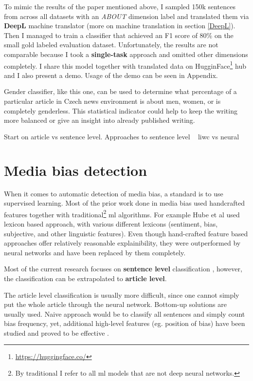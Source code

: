 To mimic the results of the paper mentioned above, I sampled 150k sentences from across all datasets with an \textit{ABOUT} dimension label and translated them via \textbf{DeepL} machine translator (more on machine translation in section \ref{DeepL}). Then I managed to train a classifier that achieved an F1 score of 80\% on the small gold labeled evaluation dataset. Unfortunately, the results are not comparable because I took a \textbf{single-task} approach and omitted other dimensions completely. I share this model together with translated data on HugginFace\footnote{\url{https://huggingface.co/}} hub and I also present a demo. Usage of the demo can be seen in Appendix.

Gender classifier, like this one, can be used to determine what percentage of a particular article in Czech news environment is about men, women, or is completely genderless. This statistical indicator could help to keep the writing more balanced or give an insight into already published writing.





Start on article vs sentence level.
Approaches to sentence level ~ liwc vs neural

\section{Media bias detection}
When it comes to automatic detection of media bias, a standard is to use supervised learning. Most of the prior work done in media bias used handcrafted features together with traditional\footnote{By traditional I refer to all \Gls{ml} models that are not deep neural networks.} \Gls{ml} algorithms. For example Hube et al \cite{hube2018detecting} used lexicon based approach, with various different lexicons (sentiment, bias, subjective, and other linguistic features). Even though hand-crafted feature based approaches offer relatively reasonable explainibility, they were outperformed by neural networks and have been replaced by them completely.

Most of the current research focuses on \textbf{sentence level} classification \cite{sinha2021determining,Spinde2021MBIC,lee2021unifying,hube2019neural}, however, the classification can be extrapolated to \textbf{article level}.

The article level classification is usually more difficult, since one cannot simply put the whole article through the neural network. Bottom-up solutions are usually used. Naive approach would be to classify all sentences and simply count bias frequency, yet, additional high-level features (eg. position of bias) have been studied and proved to be effective  \cite{chen2020detecting,chen-etal-2020-analyzing}.

